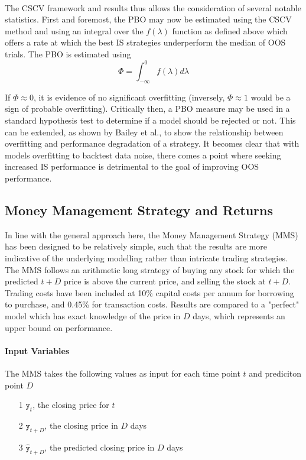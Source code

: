 \documentclass[a4paper,11pt,oneside]{article}
\theoremstyle{plain}
\theoremstyle{definition}
\begin{document}
\texttt{\\}
\newline The CSCV framework and results thus allows the consideration of several notable statistics. First and foremost, 
the PBO may now be estimated using the CSCV method and using an integral over the $f(\lambda)$ function 
as defined above which offers a rate at which the best IS strategies underperform the median of OOS trials. The PBO is estimated using
\begin{equation}
\Phi = \int_{-\infty}^{0} f (\lambda) d \lambda
\end{equation}


If $\Phi \approx 0$,
it is evidence of no significant overfitting (inversely, $\Phi \approx 1$ would be a sign of probable overfitting). Critically then, a PBO measure may be used in a standard hypothesis test to determine if a model should be rejected or not. This 
can be extended, as shown by Bailey et al., to show the relationship between overfitting and performance 
degradation of a strategy. It becomes clear that with models overfitting to backtest data noise, there comes a point 
where seeking increased IS performance is detrimental to the goal of improving OOS performance.  
\hfill \break 


\subsection{Money Management Strategy and Returns}\label{imp_mms}

In line with the general approach here, the Money Management Strategy (MMS) has been designed to be relatively simple, such that the results are more indicative of the underlying modelling rather than intricate trading strategies. The MMS follows an arithmetic long strategy of buying any stock for which the predicted ${t+D}$ price is above the current price, and selling the stock at ${t+D}$. Trading costs have been included at 10\% capital costs per annum for borrowing to purchase, and 0.45\% for transaction costs. Results are compared to a "perfect" model which has exact knowledge of the price in $D$ days, which represents an upper bound on performance.
\hfill\break

\paragraph{Input Variables}

The MMS takes the following values as input for each time point $t$  and prediciton point $D$
\begin{itemize}
	\item [1] {$\texttt{y}_t$}, the closing price for $t$
	\item [2] $\texttt{y}_{t+D}$, the closing price in $D$ days
	\item [3] $\hat{\texttt{y}}_{t+D}$, the predicted closing price in $D$ days
\end{itemize}
\end{document}
